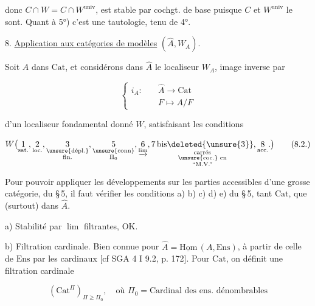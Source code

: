

donc $C\cap W=C\cap W^{\mathrm{univ}}$,   est stable par cochgt. de base puisque $C$ et $W^{\mathrm{univ}}$ le sont. Quant à 5°) c'est une tautologie,  tenu de 4°.

8. \uline{Application aux catégories de modèles} $(\widehat A,W_A)$.

Soit $A$ dans $\mathrm{Cat}$, et considérons dans $\widehat A$ le localiseur $W_A$, image inverse par

\[
\left\{\begin{aligned}i_A:\quad&\widehat A\longrightarrow\mathrm{Cat}\\&F\longmapsto A/F\end{aligned}\right.\tag*{(8.1.)}
\]

d'un localiseur fondamental donné $W$, satisfaisant les conditions

\[
W\bigl(\underset{\text{sat.}}{1},\underset{\text{loc.}}{2}, \underset{\substack{\text{\unsure{dépl.}}\\\text{fin.}}}{3}, \underset{\substack{\text{\unsure{conn}}\\\Pi_0}}{5}, \underset{\varinjlim}{6}, \underset{\substack{\text{carrés}\\\text{\unsure{coc.} en}\\\text{``M.V.''}}}{7\,\mathrm{bis}\deleted{\unsure{3}}}, \underset{\text{acc.}}{8}.\bigr)\tag*{(8.2.)}
\]


 Pour pouvoir  appliquer les développements sur les parties accessibles d'une grosse catégorie,  du \S\,5, il faut vérifier les conditions a) b) c) d) e) \deleted{\unsure{\S}} du \S\,5, tant  $\mathrm{Cat}$, que (surtout) dans $\widehat A$.

a) Stabilité par  \uline{$\lim$} filtrantes, OK.

b) Filtration cardinale. Bien connue pour $\widehat A=\underline{\mathrm{Hom}}\,(A,\mathrm{Ens})$, à partir de celle de $\mathrm{Ens}$ par les cardinaux [cf SGA 4 I 9.2, p. 172]. Pour $\mathrm{Cat}$, on définit une filtration cardinale

\[
(\mathrm{Cat}^{\Pi})_{\Pi\geq\Pi_0},\quad\text{où }\Pi_0=\text{Cardinal des ens. dénombrables}\tag*{(8.3)}
\]
